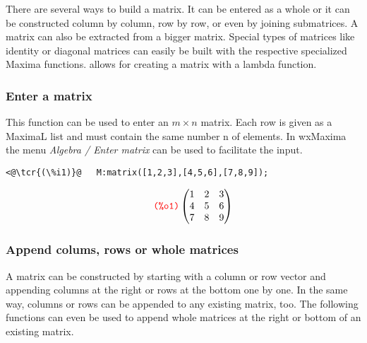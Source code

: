 \documentclass[../Maxima_Workbook.tex]{subfiles}
\begin{document}
There are several ways to build a matrix. It can be entered as a whole or it can be constructed column by column, row by row, or even by joining submatrices. A matrix can also be extracted from a bigger matrix. Special types of matrices like identity or diagonal matrices can easily be built with the respective specialized Maxima functions.  allows for creating a matrix with a lambda function.

\subsubsection{Enter a matrix}

\lz {} \hfill \tcr{[function]}

\lz This function can be used to enter an $ m \times n $ matrix. Each row is given as a MaximaL list and must contain the same number n of elements. In wxMaxima the menu \emph{Algebra / Enter matrix} can be used to facilitate the input.

\lz \begin{small} \color{blue}
\begin{lstlisting}
<@\tcr{(\%i1)}@   M:matrix([1,2,3],[4,5,6],[7,8,9]);
\end{lstlisting}
\vspace{-3.5mm} \[\tag*{\tcr{\ttfamily (\%o1)}} \begin{pmatrix}1 & 2 & 3 \\ 4 & 5 & 6 \\ 7 & 8 & 9\end{pmatrix} \]
 \vspace{-4mm}\color{black} \end{small}

\subsubsection{Append colums, rows or whole matrices}

A matrix can be constructed by starting with a column or row vector and appending columns at the right or rows at the bottom one by one. In the same way, columns or rows can be appended to any existing matrix, too. The following functions can even be used to append whole matrices at the right or bottom of an existing matrix.

\lzz {} \hfill \tcr{[function]}
\end{document}
